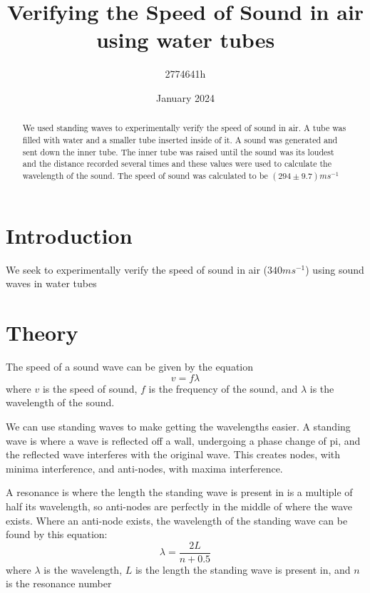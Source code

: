 \documentclass{article}
\title{Verifying the Speed of Sound in air using water tubes}
\author{2774641h}
\date{January 2024}
\begin{document}
\maketitle

\begin{abstract}
    We used standing waves to experimentally verify the speed of sound in air. A tube was filled with water and a smaller tube inserted inside of it. A sound was generated and sent down the inner tube. The inner tube was raised until the sound was its loudest and the distance recorded several times and these values were used to calculate the wavelength of the sound. The speed of sound was calculated to be $(294\pm 9.7)ms^{-1}$
\end{abstract}

\section{Introduction}
We seek to experimentally verify the speed of sound in air ($340ms^{-1}$) using sound waves in water tubes


\section{Theory}

The speed of a sound wave can be given by the equation
\begin{equation} \label{speedEqn}
    v=f\lambda
\end{equation}
where $v$ is the speed of sound, $f$ is the frequency of the sound, and $\lambda$ is the wavelength of the sound.

We can use standing waves to make getting the wavelengths easier. A standing wave is where a wave is reflected off a wall, undergoing a phase change of pi, and the reflected wave interferes with the original wave. This creates nodes, with minima interference, and anti-nodes, with maxima interference.

A resonance is where the length the standing wave is present in is a multiple of half its wavelength, so anti-nodes are perfectly in the middle of where the wave exists. Where an anti-node exists, the wavelength of the standing wave can be found by this equation:
\begin{equation} \label{wavelengthEqn}
    \lambda=\frac{2L}{n+0.5}
\end{equation}
where $\lambda$ is the wavelength, $L$ is the length the standing wave is present in, and $n$ is the resonance number
\end{document}
